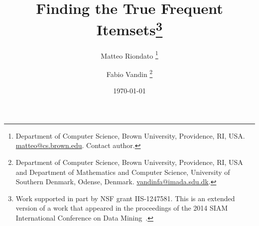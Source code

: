 \documentclass[twoside]{article}
\begin{document}
\title{Finding the True Frequent Itemsets\thanks{Work supported in part by NSF
grant IIS-1247581.
 This is an extended version of a work that appeared in the proceedings of the
 2014 SIAM International Conference on Data Mining~\citep{RiondatoV14}.
}
}
\author{Matteo Riondato
\thanks{Department of Computer Science, Brown University, Providence, RI, USA.
\url{matteo@cs.brown.edu}. Contact author.}
\and Fabio Vandin
\thanks{Department of Computer Science, Brown University, Providence, RI, USA
and Department of Mathematics and Computer Science, University of Southern
Denmark, Odense, Denmark. \url{vandinfa@imada.sdu.dk}.}
}

\date{\today}

\maketitle













%
%

%



\end{document}
